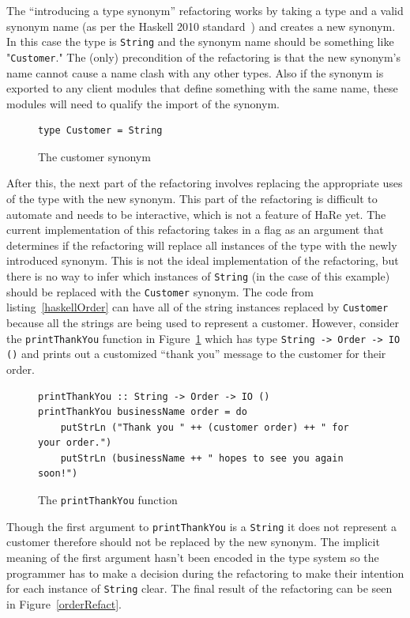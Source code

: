The ``introducing a type synonym'' refactoring works by taking a type and a valid synonym name (as per the Haskell 2010 standard~\citep{haskell2010}) and creates a new synonym. In this case the type is \texttt{String} and the synonym name should be something like "\texttt{Customer}." The (only) precondition of the refactoring is that the new synonym's name cannot cause a name clash with any other types. Also if the synonym is exported to any client modules that define something with the same name, these modules will need to qualify the import of the synonym. 

\begin{figure}[t]
\begin{lstlisting}
type Customer = String
\end{lstlisting}
\caption{The customer synonym}
\end{figure}

After this, the next part of the refactoring involves replacing the appropriate uses of the type with the new synonym. This part of the refactoring is difficult to automate and needs to be interactive, which is not a feature of HaRe yet. The current implementation of this refactoring takes in a flag as an argument that determines if the refactoring will replace all instances of the type with the newly introduced synonym. This is not the ideal implementation of the refactoring,  but there is no way to infer which instances of \texttt{String} (in the case of this example) should be replaced with the \texttt{Customer} synonym. The code from listing~\ref{haskellOrder} can have all of the string instances replaced by \texttt{Customer} because all the strings are being used to represent a customer. However, consider the \texttt{printThankYou} function in Figure~\ref{printTY} which has type \texttt{String -> Order -> IO ()} and prints out a customized ``thank you'' message to the customer for their order. 

\begin{figure}[t]
\begin{lstlisting}
printThankYou :: String -> Order -> IO ()
printThankYou businessName order = do
	putStrLn ("Thank you " ++ (customer order) ++ " for your order.")
	putStrLn (businessName ++ " hopes to see you again soon!")
\end{lstlisting}
\caption{The \texttt{printThankYou} function}
\label{printTY}
\end{figure}

Though the first argument to \texttt{printThankYou} is a \texttt{String} it does not represent a customer therefore should not be replaced by the new synonym. The implicit meaning of the first argument hasn't been encoded in the type system so the programmer has to make a decision during the refactoring to make their intention for each instance of \texttt{String} clear. The final result of the refactoring can be seen in Figure~\ref{orderRefact}. 

